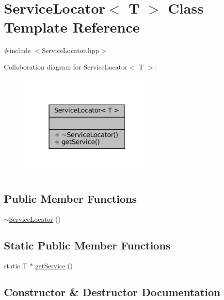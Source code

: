 \hypertarget{classServiceLocator}{}\section{Service\+Locator$<$ T $>$ Class Template Reference}
\label{classServiceLocator}


{\ttfamily \#include $<$Service\+Locator.\+hpp$>$}



Collaboration diagram for Service\+Locator$<$ T $>$\+:
\nopagebreak
\begin{figure}[H]
\begin{center}
\leavevmode
\includegraphics[width=197pt]{classServiceLocator__coll__graph}
\end{center}
\end{figure}
\subsection*{Public Member Functions}
\begin{DoxyCompactItemize}
\item 
\mbox{\hyperlink{classServiceLocator_ae001cfa8e2b3b0e7acaf1c8d95966b94}{$\sim$\+Service\+Locator}} ()
\end{DoxyCompactItemize}
\subsection*{Static Public Member Functions}
\begin{DoxyCompactItemize}
\item 
static T $\ast$ \mbox{\hyperlink{classServiceLocator_a41f5c5b0ec8ca27e1b463c5383854cbd}{get\+Service}} ()
\end{DoxyCompactItemize}


\subsection{Constructor \& Destructor Documentation}
\mbox{\label{classServiceLocator_ae001cfa8e2b3b0e7acaf1c8d95966b94}} 
